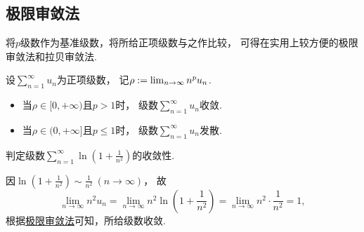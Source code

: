 


\subsection{极限审敛法}
将\(p\)级数作为基准级数，将所给正项级数与之作比较，
可得在实用上较方便的极限审敛法和拉贝审敛法.
\begin{theorem}[极限审敛法]\label{theorem:无穷级数.正项级数的极限审敛法}
设\(\sum_{n=1}^\infty u_n\)为正项级数，
记\(\rho := \lim_{n\to\infty} n^p u_n\).
\begin{itemize}
	\item 当\(\rho\in[0,+\infty)\)且\(p>1\)时，
	级数\(\sum_{n=1}^\infty u_n\)收敛.

	\item 当\(\rho\in(0,+\infty]\)且\(p\leq1\)时，
	级数\(\sum_{n=1}^\infty u_n\)发散.
\end{itemize}
\end{theorem}

\begin{example}
判定级数\(\sum_{n=1}^\infty \ln(1+\frac{1}{n^2})\)的收敛性.
\begin{solution}
因\(\ln(1+\frac{1}{n^2}) \sim \frac{1}{n^2}\ (n\to\infty)\)，
故\[
	\lim_{n\to\infty} n^2 u_n
	= \lim_{n\to\infty} n^2 \ln(1+\frac{1}{n^2})
	= \lim_{n\to\infty} n^2 \cdot \frac{1}{n^2}
	= 1,
\]
根据\hyperref[theorem:无穷级数.正项级数的极限审敛法]{极限审敛法}可知，所给级数收敛.
\end{solution}
\end{example}

